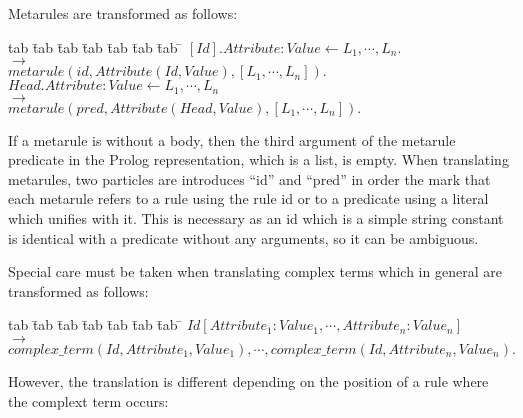\documentclass{article}
\newenvironment{program}{\begin{tabbing}
   tab \= tab \= tab \= tab \= tab \= tab \= tab \= \kill}{\end{tabbing}}
\newcommand{\rewrite}{\longrightarrow}
\begin{document}
Metarules are transformed as follows:
\begin{program}
$[Id].Attribute : Value \leftarrow L_1, \cdots, L_n.$ \\
\> $\rewrite$ \\
\> \> $metarule(id, Attribute(Id, Value), [L_1, \cdots, L_n]).$ \\
$Head.Attribute : Value \leftarrow L_1,\cdots, L_n$ \\
\> $\rewrite$ \\
\> \> $metarule(pred, Attribute(Head, Value), [L_1, \cdots, L_n]).$
\end{program}

If a metarule is without a body, then the third argument of the metarule predicate in the Prolog representation, which is a list, is empty. When translating metarules, two particles are introduces ``id'' and ``pred'' in order the mark that each metarule refers to a rule using the rule id or to a predicate using a literal which unifies with it. This is necessary as an id which is a simple string constant is identical with a predicate without any arguments, so it can be ambiguous. 

Special care must be taken when translating complex terms which in general are transformed as follows:
\begin{program}
$Id[Attribute_1 : Value_1, \cdots, Attribute_n : Value_n]$\\
\> $\rewrite$ \\
\> \> $complex\_term(Id, Attribute_1, Value_1), \cdots, complex\_term(Id, Attribute_n, Value_n).$
\end{program}

However, the translation is different depending on the position of a rule where the complext term occurs:
\end{document}
